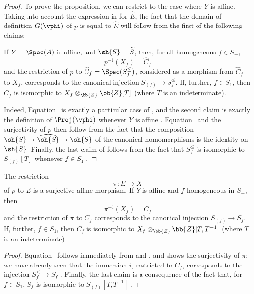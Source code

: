 \begin{proof}
To prove the proposition, we can restrict to the case where $Y$ is affine.
Taking into account the expression in  for $\widehat{E}$, the fact that the domain of definition $G(\vphi)$ of $p$ is equal to $\widehat{E}$ will follow from the first of the following claims:
\begin{env}[8.3.5.3]
\label{II.8.3.5.3}
If $Y=\Spec(A)$ is affine, and $\sh{S}=\widetilde{S}$, then, for all homogeneous $f\in S_+$,
\[
\label{II.8.3.5.4}
  p^{-1}(X_f) = \widehat{C}_f
\tag{8.3.5.4}
\]
and the restriction of $p$ to $\widehat{C}_f=\Spec(S_f^\leq)$, considered as a morphism from $\widehat{C}_f$ to $X_f$, corresponds to the canonical injection $S_{(f)}\to S_f^\leq$.
If, further, $f\in S_1$, then $\widehat{C}_f$ is isomorphic to $X_f\otimes_{\bb{Z}}\bb{Z}[T]$ (where $T$ is an indeterminate).
\end{env}

Indeed, Equation~ is exactly a particular case of , and the second claim is exactly the definition of $\Proj(\vphi)$ whenever $Y$ is affine .
Equation~ and the surjectivity of $p$ then follow from the fact that the composition $\sh{S}\to\widehat{\sh{S}}\to\sh{S}$ of the canonical homomorphisms is the identity on $\sh{S}$.
Finally, the last claim of  follows from the fact that $S_f^\leq$ is isomorphic to $S_{(f)}[T]$ whenever $f\in S_1$ .
\end{proof}

\begin{corollary}[8.3.6]
\label{II.8.3.6}
The restriction
\[
\label{II.8.3.6.1}
  \pi: E \to X
\tag{8.3.6.1}
\]
of $p$ to $E$ is a surjective affine morphism.
If $Y$ is affine and $f$ homogeneous in $S_+$, then
\[
\label{II.8.3.6.2}
  \pi^{-1}(X_f) = C_f
\tag{8.3.6.2}
\]
and the restriction of $\pi$ to $C_f$ corresponds to the canonical injection $S_{(f)}\to S_f$.
If, further, $f\in S_1$, then $C_f$ is isomorphic to $X_f\otimes_{\bb{Z}}\bb{Z}[T,T^{-1}]$ (where $T$ is an indeterminate).
\end{corollary}

\begin{proof}
Equation~ follows immediately from  and , and shows the surjectivity of $\pi$;
we have already seen that the immersion $i$, restricted to $C_f$, corresponds
to the injection $S_f^\leq\to S_f$ .
Finally, the last claim is a consequence of the fact that, for $f\in S_1$, $S_f$ is isomorphic to $S_{(f)}[T,T^{-1}]$ .
\end{proof}

